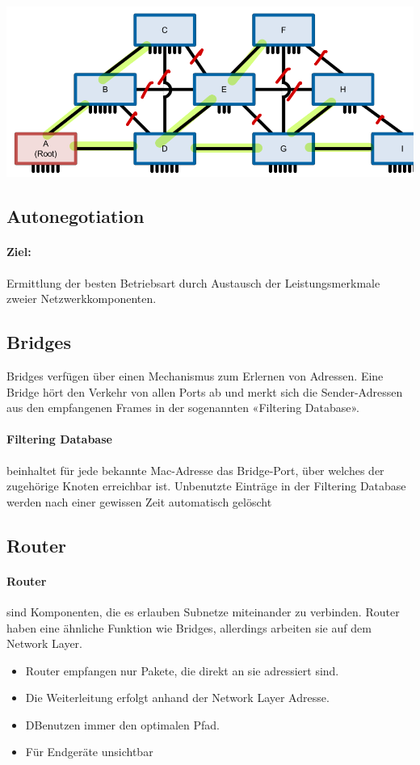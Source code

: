 \includegraphics[scale=.275]{img/spanning_tree.png}

\subsection{Autonegotiation}


\paragraph{Ziel:}  Ermittlung der besten Betriebsart durch Austausch der
Leistungsmerkmale zweier Netzwerkkomponenten.


\subsection{Bridges}
{Bridges verfügen über einen Mechanismus zum Erlernen von Adressen. Eine Bridge hört den Verkehr von allen Ports ab und merkt sich die Sender-Adressen aus den
    empfangenen Frames in der sogenannten «Filtering Database».}
\paragraph{Filtering Database} beinhaltet für jede bekannte Mac-Adresse das Bridge-Port, über welches der zugehörige
Knoten erreichbar ist. Unbenutzte Einträge in der Filtering Database werden nach einer gewissen Zeit automatisch gelöscht

\subsection{Router}

\paragraph{Router}  sind Komponenten, die es erlauben Subnetze miteinander zu verbinden. Router haben eine ähnliche Funktion wie Bridges, allerdings arbeiten sie auf dem
Network Layer.
    {
        \begin{itemize}[noitemsep]
            \item Router empfangen nur Pakete, die direkt an sie adressiert sind.
            \item Die Weiterleitung erfolgt anhand der Network Layer Adresse.
            \item DBenutzen immer den optimalen Pfad.
            \item  Für Endgeräte unsichtbar
        \end{itemize}
    }

